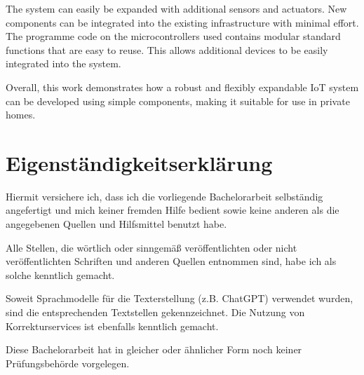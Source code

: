 \documentclass[12pt, letterpaper]{article}
\begin{document}
\par The system can easily be expanded with additional sensors and actuators. New components can be integrated into the existing infrastructure with minimal effort. The programme code on the microcontrollers used contains modular standard functions that are easy to reuse. This allows additional devices to be easily integrated into the system.
\par Overall, this work demonstrates how a robust and flexibly expandable IoT system can be developed using simple components, making it suitable for use in private homes.
\pagebreak
\section*{Eigenständigkeitserklärung}
\par Hiermit versichere ich, dass ich die vorliegende Bachelorarbeit selbständig angefertigt und mich keiner fremden Hilfe bedient sowie keine anderen als die angegebenen Quellen und Hilfsmittel benutzt habe.
\par Alle Stellen, die wörtlich oder sinngemäß veröffentlichten oder nicht veröffentlichten Schriften und anderen Quellen entnommen sind, habe ich als solche kenntlich gemacht. 
\par Soweit Sprachmodelle für die Texterstellung (z.B. ChatGPT) verwendet wurden, sind die entsprechenden Textstellen gekennzeichnet. Die Nutzung von Korrekturservices ist ebenfalls kenntlich gemacht.
\par Diese Bachelorarbeit hat in gleicher oder ähnlicher Form noch keiner Prüfungsbehörde vorgelegen.
\pagebreak
\end{document}
